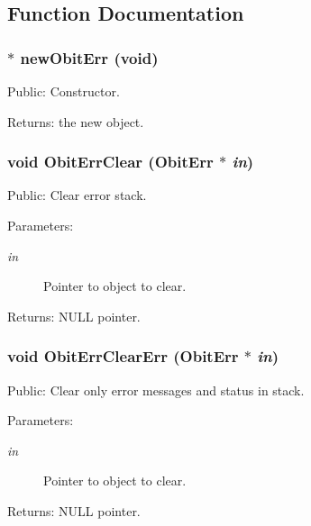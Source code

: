\subsection{Function Documentation}
\subsubsection{$\ast$ new\-Obit\-Err (void)}\label{ObitErr_8c_a6}


Public: Constructor. 

\begin{Desc}
\item[Returns:]the new object. \end{Desc}
\subsubsection{\setlength{\rightskip}{0pt plus 5cm}void Obit\-Err\-Clear ({\bf Obit\-Err} $\ast$ {\em in})}\label{ObitErr_8c_a9}


Public: Clear error stack. 

\begin{Desc}
\item[Parameters:]
\begin{description}
\item[{\em in}]Pointer to object to clear. \end{description}
\end{Desc}
\begin{Desc}
\item[Returns:]NULL pointer. \end{Desc}
\subsubsection{\setlength{\rightskip}{0pt plus 5cm}void Obit\-Err\-Clear\-Err ({\bf Obit\-Err} $\ast$ {\em in})}\label{ObitErr_8c_a10}


Public: Clear only error messages and status in stack. 

\begin{Desc}
\item[Parameters:]
\begin{description}
\item[{\em in}]Pointer to object to clear. \end{description}
\end{Desc}
\begin{Desc}
\item[Returns:]NULL pointer. \end{Desc}

